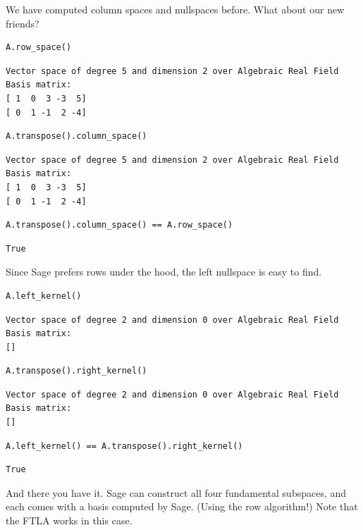 \documentclass[10pt,]{book}
\theoremstyle{plain}
\theoremstyle{definition}
\numberwithin{equation}{section}
\begin{document}
      We have computed column spaces and nullspaces before. What about our
      new friends?
\begin{lstlisting}[style=sageinput]
A.row_space()
\end{lstlisting}
\begin{lstlisting}[style=sageoutput]
Vector space of degree 5 and dimension 2 over Algebraic Real Field
Basis matrix:
[ 1  0  3 -3  5]
[ 0  1 -1  2 -4]
\end{lstlisting}
\begin{lstlisting}[style=sageinput]
A.transpose().column_space()
\end{lstlisting}
\begin{lstlisting}[style=sageoutput]
Vector space of degree 5 and dimension 2 over Algebraic Real Field
Basis matrix:
[ 1  0  3 -3  5]
[ 0  1 -1  2 -4]
\end{lstlisting}
\begin{lstlisting}[style=sageinput]
A.transpose().column_space() == A.row_space()
\end{lstlisting}
\begin{lstlisting}[style=sageoutput]
True
\end{lstlisting}
\par

      Since Sage prefers rows under the hood, the left nullspace is easy to find.
\begin{lstlisting}[style=sageinput]
A.left_kernel()
\end{lstlisting}
\begin{lstlisting}[style=sageoutput]
Vector space of degree 2 and dimension 0 over Algebraic Real Field
Basis matrix:
[]
\end{lstlisting}
\begin{lstlisting}[style=sageinput]
A.transpose().right_kernel()
\end{lstlisting}
\begin{lstlisting}[style=sageoutput]
Vector space of degree 2 and dimension 0 over Algebraic Real Field
Basis matrix:
[]
\end{lstlisting}
\begin{lstlisting}[style=sageinput]
A.left_kernel() == A.transpose().right_kernel()
\end{lstlisting}
\begin{lstlisting}[style=sageoutput]
True
\end{lstlisting}
\par

      And there you have it. Sage can construct all four fundamental subspaces,
      and each comes with a basis computed by Sage. (Using the row algorithm!)
      Note that the FTLA works in this case.
\typeout{************************************************}
\typeout{************************************************}
\end{document}

